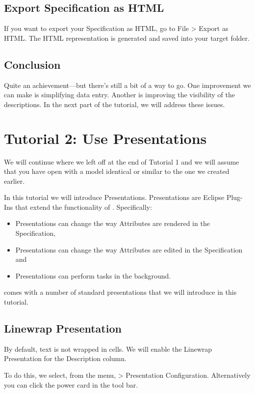 \subsection{Export Specification as HTML}

If you want to export your Specification as HTML, go to File \textgreater{} Export as HTML.
The HTML representation is generated and saved into your target folder.

\subsection{Conclusion}

Quite an achievement—but there's still a bit of a way to go.  One improvement 
we can make is simplifying data entry.  Another is improving 
the visibility of the descriptions.  In the next part of the
tutorial, we will address these issues.

\section{Tutorial 2: Use Presentations}
We will continue where we left off at the end of Tutorial 1 and we will assume that
you have \pror{} open with a model identical or similar to the one we created earlier.

In this tutorial we will introduce Presentations.  Presentations are
Eclipse Plug-Ins that extend the functionality of \pror{}.  Specifically:

\begin{itemize}
\item
  Presentations can change the way Attributes are rendered in the
  Specification,
\item
  Presentations can change the way Attributes are edited in the
  Specification and
\item
  Presentations can perform tasks in the background.
\end{itemize}

\pror{} comes with a number of standard presentations that we will
introduce in this tutorial.

\subsection{Linewrap Presentation}

By default, text is not wrapped in cells.  We will enable the Linewrap
Presentation for the Description column.

To do this, we select, from the menu,  \pror{} \textgreater{} Presentation Configuration. Alternatively you can click the power card in the tool bar.

